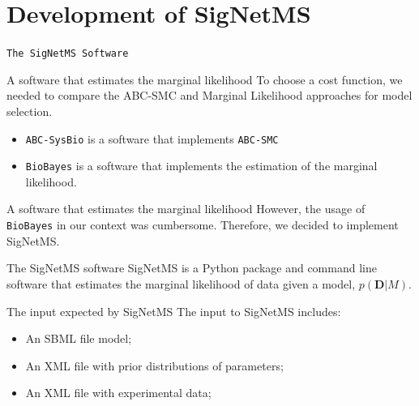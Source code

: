 \documentclass{beamer}
\begin{document}
\section{Development of SigNetMS}

\begin{frame}{}
\begin{center}
    \texttt{The SigNetMS Software}
\end{center}
\end{frame}

\begin{frame}{A software that estimates the marginal likelihood}
To choose a cost function, we needed to compare the ABC-SMC and Marginal
Likelihood approaches for model selection.
\pause
\begin{itemize}
    \item{\texttt{ABC-SysBio} is a software that implements
        \texttt{ABC-SMC}}
    \item{\texttt{BioBayes} is a software that implements the estimation
        of the marginal likelihood.}
\end{itemize}
\end{frame}

\begin{frame}{A software that estimates the marginal likelihood}
However, the usage of \texttt{BioBayes} in our context was cumbersome.
\pause
Therefore, we decided to implement \alert{SigNetMS}.
\end{frame}

\begin{frame}{The SigNetMS software}
SigNetMS is a Python package and command line software that estimates 
the marginal likelihood of data given a model, $p({\bm D}|M)$.
\end{frame}

\begin{frame}{The input expected by SigNetMS}
The input to SigNetMS includes:
\begin{itemize}
    \item{An SBML file model;}
    \item{An XML file with prior distributions of parameters;}
    \item{An XML file with experimental data;}
\end{itemize}
\end{frame}
\end{document}
